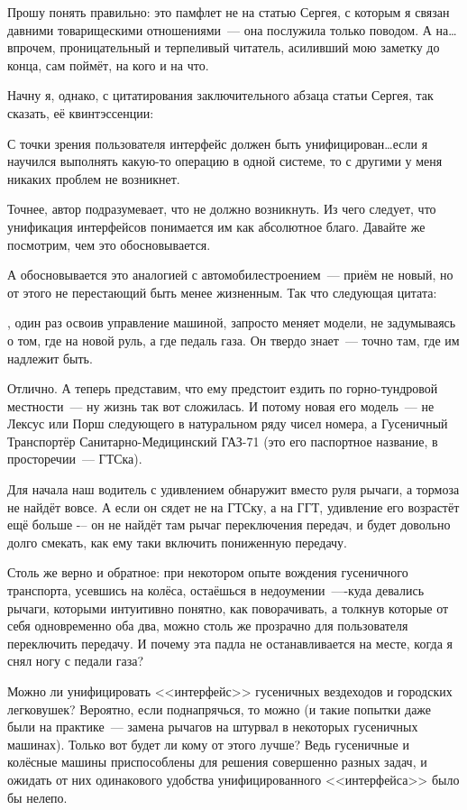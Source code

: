 Прошу понять правильно: это памфлет не на статью Сергея, с которым я связан давними товарищескими отношениями~--- она послужила только поводом. А на\dots впрочем, проницательный и терпеливый читатель, асиливший мою заметку до конца, сам поймёт, на кого и на что.

Начну я, однако, с цитатирования заключительного абзаца статьи Сергея, так сказать, её квинтэссенции:
\begin{shadequote}{}
С точки зрения пользователя интерфейс должен быть унифицирован\dots если я научился выполнять какую-то операцию в одной системе, то с другими у меня никаких проблем не возникнет.
\end{shadequote}

Точнее, автор подразумевает, что не должно возникнуть. Из чего следует, что унификация интерфейсов понимается им как абсолютное благо. Давайте же посмотрим, чем это обосновывается.

А обосновывается это аналогией с автомобилестроением~--- приём не новый, но от этого не перестающий быть менее жизненным. Так что следующая цитата:
\begin{shadequote}{}
, один раз освоив управление машиной, запросто меняет модели, не задумываясь о том, где на новой руль, а где педаль газа. Он твердо знает~--- точно там, где им надлежит быть.
\end{shadequote}

Отлично.  А теперь представим, что ему предстоит ездить по горно-тундровой местности~--- ну жизнь так вот сложилась. И потому новая его модель~--- не Лексус или Порш следующего в натуральном ряду чисел номера, а Гусеничный Транспортёр Санитарно-Медицинский ГАЗ-71 (это его паспортное название, в просторечии~--- ГТСка).

Для начала наш водитель  с удивлением обнаружит вместо руля рычаги, а тормоза не найдёт вовсе. А если он сядет не на ГТСку, а на ГГТ, удивление его возрастёт ещё больше -– он не найдёт там рычаг переключения передач, и будет довольно долго смекать, как ему таки включить пониженную передачу.

Столь же верно и обратное: при некотором опыте вождения гусеничного транспорта, усевшись на колёса, остаёшься в недоумении~----куда девались  рычаги, которыми интуитивно понятно, как поворачивать, а толкнув которые от себя одновременно оба два, можно столь же прозрачно для пользователя переключить передачу. И почему эта падла не останавливается на месте, когда я снял ногу с педали газа?

Можно ли унифицировать <<интерфейс>> гусеничных вездеходов и городских легковушек? Вероятно, если поднапрячься, то можно (и такие попытки даже были на практике~--- замена рычагов на штурвал в некоторых гусеничных машинах). Только вот будет ли кому от этого лучше? Ведь гусеничные и колёсные машины приспособлены для решения совершенно разных задач, и ожидать от них одинакового удобства унифицированного <<интерфейса>> было бы нелепо.

